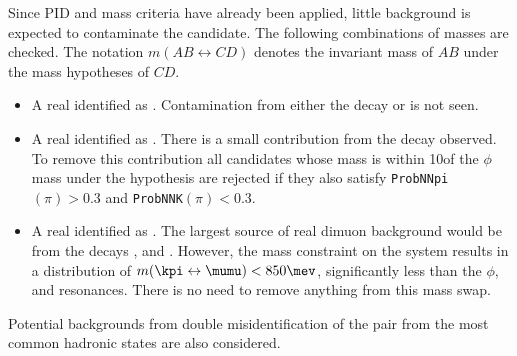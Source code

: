 Since PID and mass criteria have already been applied, little background is expected to
contaminate the \Kstarz  candidate.
The following combinations of masses are checked.
The notation $m(AB\leftrightarrow CD)$ denotes the invariant mass of $AB$ under the mass hypotheses of $CD$.
\begin{itemize}
  \item A real \pipi identified as \kpi.
    Contamination from either the decay \decay{\KS}{\pipi} or \decay{\rho}{\pipi} is not seen.
  \item A real \kk identified as \kpi.
    There is a small contribution from the decay \decay{\phi}{\kk} observed.
    To remove this contribution all candidates whose mass is within 10\mev of the $\phi$ mass under
    the \kk hypothesis
    are rejected if they also satisfy {\tt ProbNNpi$(\pi)>0.3$} and {\tt ProbNNK$(\pi)<0.3$}.
  \item A real \mumu identified as \kpi.
    The largest source of real dimuon background would be from the decays \decay{\phi}{\mumu},
    \decay{\jpsi}{\mumu} and \decay{\psitwos}{\mumu}.
    However, the mass constraint on the \kpi system results in a
    distribution of $m(\kpi\leftrightarrow\mumu)<850\mev$, significantly less than the $\phi$,
    \jpsi and \psitwos resonances.
    There is no need to remove anything from this mass swap.
\end{itemize}
Potential backgrounds from double misidentification of the \mumu pair from the most common hadronic
states are also considered.
